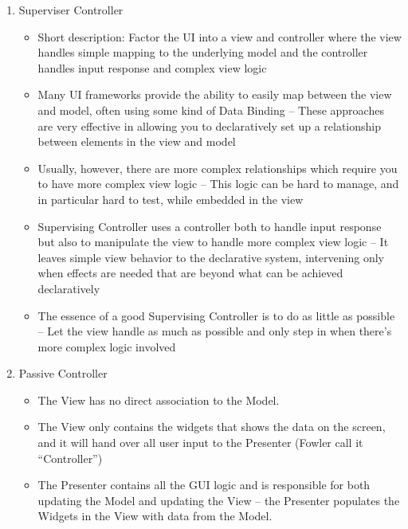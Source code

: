 \documentclass[../SWD_disp.tex]{subfiles}
\begin{document}
\begin{enumerate}
	\item Superviser Controller
	\begin{itemize}
		\item Short description:
	Factor the UI into a view and controller where the view handles simple mapping to the
	underlying model and the controller handles input response and complex view logic
	\item Many UI frameworks provide the ability to easily map between the view and
	model, often using some kind of Data Binding
	– These approaches are very effective in allowing you to declaratively set up a
	relationship between elements in the view and model
	\item Usually, however, there are more complex relationships which require you to have
	more complex view logic
	– This logic can be hard to manage, and in particular hard to test, while embedded in the
	view
	\item Supervising Controller uses a controller both to handle input response but also to
	manipulate the view to handle more complex view logic
	– It leaves simple view behavior to the declarative system, intervening only when effects
	are needed that are beyond what can be achieved declaratively
	\item The essence of a good Supervising Controller is to do as little as possible
	– Let the view handle as much as possible and only step in when there's more complex
	logic involved 
	\end{itemize}
	\item Passive Controller
	\begin{itemize}
		 \item The View has no direct association to the
Model.
\item The View only contains the widgets that
shows the data on the screen, and it will
hand over all user input to the Presenter
(Fowler call it “Controller”)
\item The Presenter contains all the GUI logic and
is responsible for both updating the Model
and updating the View
– the Presenter populates the Widgets in the View
with data from the Model. 
	\end{itemize}
\end{enumerate}
\end{document}

